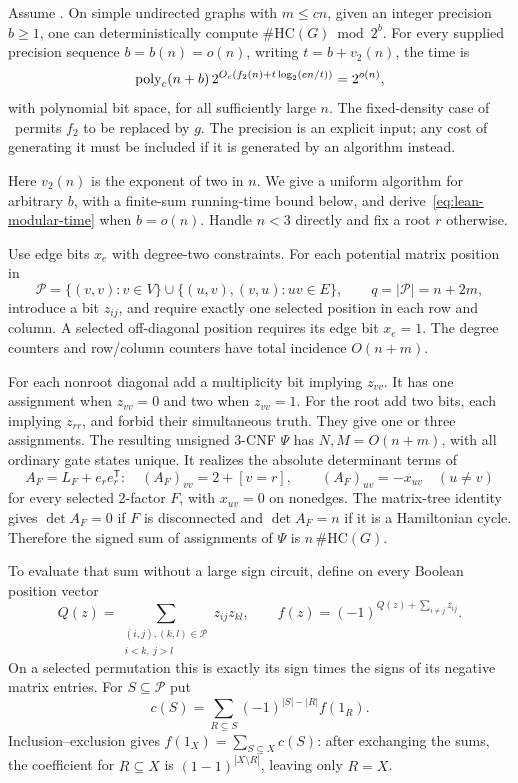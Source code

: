 \begin{theorem}
\label{thm:lean-modular}
Assume \HLean. On simple undirected graphs with $m\le cn$, given
an integer precision $b\ge1$, one can deterministically compute
$\#\mathrm{HC}(G)\bmod2^b$. For every supplied precision sequence
$b=b(n)=o(n)$, writing $t=b+v_2(n)$, the time is
\begin{equation}\label{eq:lean-modular-time}
 \operatorname{poly}_c(n+b)\,
 2^{O_c(f_2(n)+t\log_2(en/t))}=2^{o(n)},
\end{equation}
with polynomial bit space, for all sufficiently large $n$.
The fixed-density case of \HBB\ permits $f_2$ to be replaced by $g$.
The precision is an explicit input; any cost of generating it must be
included if it is generated by an algorithm instead.
\end{theorem}

Here $v_2(n)$ is the exponent of two in $n$. We give a uniform
algorithm for arbitrary $b$, with a finite-sum running-time bound
below, and derive~\eqref{eq:lean-modular-time} when $b=o(n)$.
Handle $n<3$ directly and fix a root $r$ otherwise.

Use edge bits $x_e$ with degree-two constraints. For each potential
matrix position in
\[
 \mathcal P=\{(v,v):v\in V\}\cup
     \{(u,v),(v,u):uv\in E\},\qquad q=|\mathcal P|=n+2m,
\]
introduce a bit $z_{ij}$, and require exactly one selected position
in each row and column. A selected off-diagonal position requires
its edge bit $x_e=1$. The degree counters and row/column counters
have total incidence $O(n+m)$.

For each nonroot diagonal add a multiplicity bit implying $z_{vv}$.
It has one assignment when $z_{vv}=0$ and two when $z_{vv}=1$.
For the root add two bits, each implying $z_{rr}$, and forbid their
simultaneous truth. They give one or three assignments. The resulting
unsigned 3-CNF $\Psi$ has $N,M=O(n+m)$, with all ordinary gate states
unique. It realizes the absolute determinant terms of
\[
 A_F=L_F+e_re_r^{\mathsf T}:
 \quad (A_F)_{vv}=2+[v=r],\qquad
 (A_F)_{uv}=-x_{uv}\quad(u\ne v)
\]
for every selected 2-factor $F$, with $x_{uv}=0$ on nonedges.
The matrix-tree identity gives
$\det A_F=0$ if $F$ is disconnected and $\det A_F=n$ if it is a
Hamiltonian cycle. Therefore the signed sum of assignments of
$\Psi$ is $n\,\#\mathrm{HC}(G)$.

To evaluate that sum without a large sign circuit, define on every
Boolean position vector
\[
 Q(z)=\sum_{\substack{(i,j),(k,l)\in\mathcal P\\i<k,\ j>l}}
             z_{ij}z_{kl},\qquad
 f(z)=(-1)^{Q(z)+\sum_{i\ne j}z_{ij}}.
\]
On a selected permutation this is exactly its sign times the signs
of its negative matrix entries. For $S\subseteq\mathcal P$ put
\begin{equation}\label{eq:lean-mobius}
 c(S)=\sum_{R\subseteq S}(-1)^{|S|-|R|}f(1_R).
\end{equation}
Inclusion--exclusion gives $f(1_X)=\sum_{S\subseteq X}c(S)$:
after exchanging the sums, the coefficient for $R\subseteq X$ is
$(1-1)^{|X\setminus R|}$, leaving only $R=X$.

